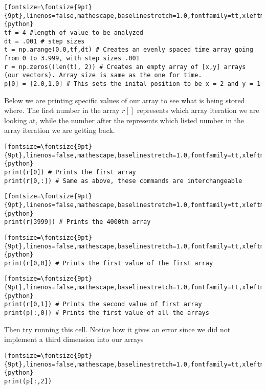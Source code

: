 \documentclass[%
oneside,                 %
final,                   %
10pt]{article}
\begin{document}
\begin{verbatim}[fontsize=\fontsize{9pt}{9pt},linenos=false,mathescape,baselinestretch=1.0,fontfamily=tt,xleftmargin=7mm]{python}
tf = 4 #length of value to be analyzed
dt = .001 # step sizes
t = np.arange(0.0,tf,dt) # Creates an evenly spaced time array going from 0 to 3.999, with step sizes .001
r = np.zeros((len(t), 2)) # Creates an empty array of [x,y] arrays (our vectors). Array size is same as the one for time.
p[0] = [2.0,1.0] # This sets the inital position to be x = 2 and y = 1
\end{verbatim}

Below we are printing specific values of our array to see what is being
stored where. The first number in the array $r[]$ represents which array
iteration we are looking at, while the number after the  represents
which listed number in the array iteration we are getting back. 


\begin{verbatim}[fontsize=\fontsize{9pt}{9pt},linenos=false,mathescape,baselinestretch=1.0,fontfamily=tt,xleftmargin=7mm]{python}
print(r[0]) # Prints the first array
print(r[0,:]) # Same as above, these commands are interchangeable 
\end{verbatim}
\begin{verbatim}[fontsize=\fontsize{9pt}{9pt},linenos=false,mathescape,baselinestretch=1.0,fontfamily=tt,xleftmargin=7mm]{python}
print(r[3999]) # Prints the 4000th array
\end{verbatim}

\begin{verbatim}[fontsize=\fontsize{9pt}{9pt},linenos=false,mathescape,baselinestretch=1.0,fontfamily=tt,xleftmargin=7mm]{python}
print(r[0,0]) # Prints the first value of the first array
\end{verbatim}
\begin{verbatim}[fontsize=\fontsize{9pt}{9pt},linenos=false,mathescape,baselinestretch=1.0,fontfamily=tt,xleftmargin=7mm]{python}
print(r[0,1]) # Prints the second value of first array
print(p[:,0]) # Prints the first value of all the arrays
\end{verbatim}
Then try running this cell. Notice how it gives an error since we did not implement a third dimension into our arrays
\begin{verbatim}[fontsize=\fontsize{9pt}{9pt},linenos=false,mathescape,baselinestretch=1.0,fontfamily=tt,xleftmargin=7mm]{python}
print(p[:,2])
\end{verbatim}
\end{document}
